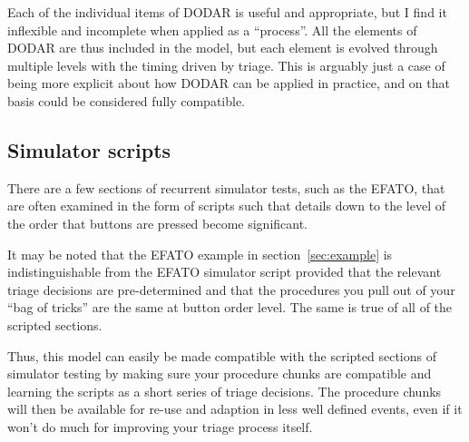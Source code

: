 \documentclass[a5paper,11pt,titlepage]{article}
\begin{document}
Each of the individual items of DODAR is useful and appropriate, but I
find it inflexible and incomplete when applied as a ``process''. All the
elements of DODAR are thus included in the model, but each element is
evolved through multiple levels with the timing driven by triage. This
is arguably just a case of being more explicit about how DODAR can be
applied in practice, and on that basis could be considered fully
compatible.

\subsection{Simulator scripts}

There are a few sections of recurrent simulator tests, such as the
EFATO, that are often examined in the form of scripts such that details
down to the level of the order that buttons are pressed become
significant.

It may be noted that the EFATO example in section~\ref{sec:example} is
indistinguishable from the EFATO simulator script provided that the
relevant triage decisions are pre-determined and that the procedures you
pull out of your ``bag of tricks'' are the same at button order
level. The same is true of all of the scripted sections.

Thus, this model can easily be made compatible with the scripted
sections of simulator testing by making sure your procedure chunks are
compatible and learning the scripts as a short series of triage
decisions. The procedure chunks will then be available for re-use and
adaption in less well defined events, even if it won't do much for
improving your triage process itself.
\end{document}
